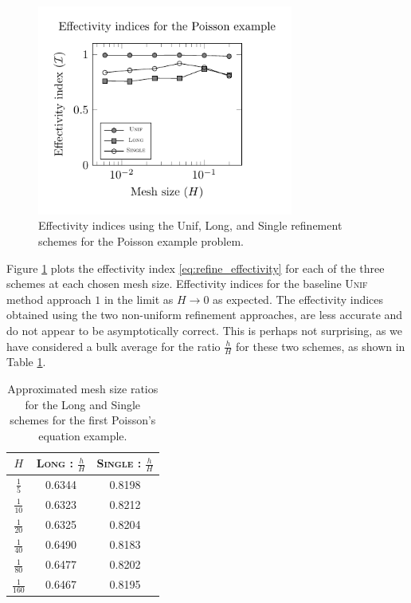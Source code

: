 \begin{figure}[ht!]
\centering
\includegraphics[width=0.75\textwidth]{img/refine_poisson_effectivity}
\caption{Effectivity indices using the Unif,
Long, and Single refinement schemes for
the Poisson example problem.}
\label{fig:refine_poisson_effectivity}
\end{figure}

Figure \ref{fig:refine_poisson_effectivity} plots
the effectivity index \eqref{eq:refine_effectivity}
for each of the three schemes at each chosen
mesh size. Effectivity indices for the
baseline \textsc{Unif} method approach
$1$ in the limit as $H \to 0$ as expected. The effectivity
indices obtained using the two non-uniform refinement approaches,
are less accurate
and do not appear to be asymptotically correct.
This is perhaps not surprising, as we have considered a bulk
average for the ratio $\frac{h}{H}$ for these two schemes,
as shown in Table \ref{tab:refine_poisson_ratios}.

%
\begin{table}[ht!]
\centering
\begin{tabular}{ | c | c | c | } \hline
$H$ & \textsc{Long} : $\frac{h}{H}$ & \textsc{Single} : $\frac{h}{H}$ \\ \hline \hline
$\frac{1}{5}$ & 0.6344 & 0.8198 \\ \hline
$\frac{1}{10}$ & 0.6323 & 0.8212 \\ \hline
$\frac{1}{20}$ & 0.6325 & 0.8204 \\ \hline
$\frac{1}{40}$ & 0.6490 & 0.8183 \\ \hline
$\frac{1}{80}$ & 0.6477 & 0.8202 \\ \hline
$\frac{1}{160}$ & 0.6467 & 0.8195 \\ \hline
\end{tabular}
\caption{Approximated mesh size ratios for the Long and
Single schemes for the first Poisson's equation example.}
\label{tab:refine_poisson_ratios}
\end{table}

